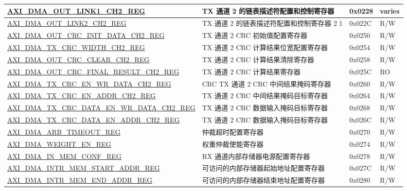 \begin{longtable}{ | l | l | p{1.3cm} | l | }
\hyperref[regdesc:AXIDMAOUTLINK1CHNREG]{AXI\_DMA\_OUT\_LINK1\_CH2\_REG} & TX 通道 2 的链表描述符配置和控制寄存器 & 0x0228 & varies \\ \hline
\hyperref[regdesc:AXIDMAOUTLINK2CHNREG]{AXI\_DMA\_OUT\_LINK2\_CH2\_REG} & TX 通道 2 的链表描述符配置和控制寄存器 2 1 & 0x022C & R/W \\ \hline
\hyperref[regdesc:AXIDMAOUTCRCINITDATACHNREG]{AXI\_DMA\_OUT\_CRC\_INIT\_DATA\_CH2\_REG} & TX 通道 2 CRC 初始值配置寄存器 & 0x0250 & R/W \\ \hline
\hyperref[regdesc:AXIDMATXCRCWIDTHCHNREG]{AXI\_DMA\_TX\_CRC\_WIDTH\_CH2\_REG} & TX 通道 2 CRC 计算结果位宽配置寄存器 & 0x0254 & R/W \\ \hline
\hyperref[regdesc:AXIDMAOUTCRCCLEARCHNREG]{AXI\_DMA\_OUT\_CRC\_CLEAR\_CH2\_REG} & TX 通道 2 CRC 计算结果清除寄存器 & 0x0258 & R/W \\ \hline
\hyperref[regdesc:AXIDMAOUTCRCFINALRESULTCHNREG]{AXI\_DMA\_OUT\_CRC\_FINAL\_RESULT\_CH2\_REG} & TX 通道 2 CRC 计算结果寄存器 & 0x025C & RO \\ \hline
\hyperref[regdesc:AXIDMATXCRCENWRDATACHNREG]{AXI\_DMA\_TX\_CRC\_EN\_WR\_DATA\_CH2\_REG} & CRC TX 通道 2 CRC 中间结果掩码寄存器 & 0x0260 & R/W \\ \hline
\hyperref[regdesc:AXIDMATXCRCENADDRCHNREG]{AXI\_DMA\_TX\_CRC\_EN\_ADDR\_CH2\_REG} & TX 通道 2 CRC 中间结果掩码目标寄存器 & 0x0264 & R/W \\ \hline
\hyperref[regdesc:AXIDMATXCRCDATAENWRDATACHNREG]{AXI\_DMA\_TX\_CRC\_DATA\_EN\_WR\_DATA\_CH2\_REG} & TX 通道 2 CRC 数据输入掩码目标寄存器 & 0x0268 & R/W \\ \hline
\hyperref[regdesc:AXIDMATXCRCDATAENADDRCHNREG]{AXI\_DMA\_TX\_CRC\_DATA\_EN\_ADDR\_CH2\_REG} & TX 通道 2 CRC 数据输入掩码目标寄存器 & 0x026C & R/W \\ \hline
\hyperref[regdesc:AXIDMAARBTIMEOUTREG]{AXI\_DMA\_ARB\_TIMEOUT\_REG} & 仲裁超时配置寄存器 & 0x0270 & R/W \\ \hline
\hyperref[regdesc:AXIDMAWEIGHTENREG]{AXI\_DMA\_WEIGHT\_EN\_REG} & 权重仲裁使能寄存器 & 0x0274 & R/W \\ \hline
\hyperref[regdesc:AXIDMAINMEMCONFREG]{AXI\_DMA\_IN\_MEM\_CONF\_REG} & RX 通道内部存储器电源配置寄存器 & 0x0278 & R/W \\ \hline
\hyperref[regdesc:AXIDMAINTRMEMSTARTADDRREG]{AXI\_DMA\_INTR\_MEM\_START\_ADDR\_REG} & 可访问的内部存储器起始地址配置寄存器 & 0x027C & R/W \\ \hline
\hyperref[regdesc:AXIDMAINTRMEMENDADDRREG]{AXI\_DMA\_INTR\_MEM\_END\_ADDR\_REG} & 可访问的内部存储器结束地址配置寄存器 & 0x0280 & R/W \\ \hline

\end{longtable}
